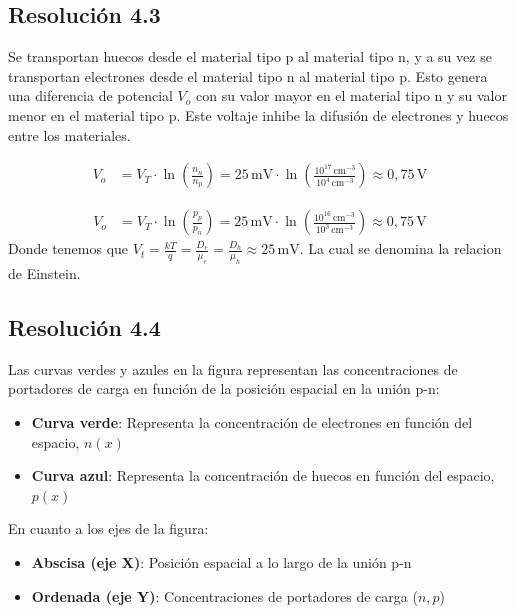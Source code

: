 \documentclass[
  11pt,
  letterpaper,
   addpoints,
   answers
  ]{exam}
\begin{document}
\begin{questions}
\begin{solution}
    \subsection*{Resolución 4.3}
    
    Se transportan huecos desde el material tipo p al material tipo n, y a su vez se transportan electrones desde el material tipo n al material tipo p. Esto genera una diferencia de potencial $V_o$ con su valor mayor en el material tipo n y su valor menor en el material tipo p. Este voltaje inhibe la difusión de electrones y huecos entre los materiales.

    \begin{align}
        V_o &= V_T \cdot \ln\left(\frac{n_n}{n_p}\right) = 25\,\text{mV} \cdot \ln\left(\frac{10^{17}\,\text{cm}^{-3}}{10^4\,\text{cm}^{-3}}\right) \approx 0{,}75\,\text{V}
    \end{align}

    \begin{align}
        V_o &= V_T \cdot \ln\left(\frac{p_p}{p_n}\right) = 25\,\text{mV} \cdot \ln\left(\frac{10^{16}\,\text{cm}^{-3}}{10^3\,\text{cm}^{-3}}\right) \approx 0{,}75\,\text{V}
    \end{align}
Donde tenemos que $V_{t} = \frac{kT}{q} = \frac{D_{e}}{\mu_{e}} = \frac{D_{h}}{\mu_{h}} \approx 25\,\text{mV}$. La cual se denomina la relacion de Einstein.
    \subsection*{Resolución 4.4}
    
    Las curvas verdes y azules en la figura representan las concentraciones de portadores de carga en función de la posición espacial en la unión p-n:

    \begin{itemize}
        \item \textbf{Curva verde}: Representa la concentración de electrones en función del espacio, $n(x)$
        \item \textbf{Curva azul}: Representa la concentración de huecos en función del espacio, $p(x)$
    \end{itemize}

    En cuanto a los ejes de la figura:
    \begin{itemize}
        \item \textbf{Abscisa (eje X)}: Posición espacial a lo largo de la unión p-n
        \item \textbf{Ordenada (eje Y)}: Concentraciones de portadores de carga ($n, p$)
    \end{itemize}


\end{solution}
\end{questions}
\end{document}
